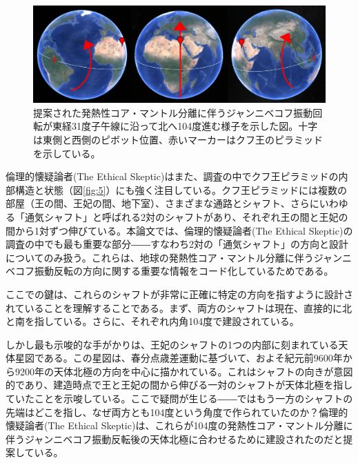 \documentclass[10pt,twocolumn,letterpaper]{article}
\begin{document}
\begin{figure}[t]
\begin{center}
\includegraphics[width=1\textwidth]{drawing.jpg}
\end{center}
   \caption{提案された発熱性コア・マントル分離に伴うジャンニベコフ振動回転が東経31度子午線に沿って北へ104度進む様子を示した図。十字は東側と西側のピボット位置、赤いマーカーはクフ王のピラミッドを示している。}
\label{fig:6}
\end{figure}

倫理的懐疑論者(The Ethical Skeptic)はまた、調査の中でクフ王ピラミッドの内部構造と状態（図\ref{fig:5}）にも強く注目している\cite{28}。クフ王ピラミッドには複数の部屋（王の間、王妃の間、地下室）、さまざまな通路とシャフト、さらにいわゆる「通気シャフト」と呼ばれる2対のシャフトがあり、それぞれ王の間と王妃の間から1対ずつ伸びている\cite{29,30}。本論文では、倫理的懐疑論者(The Ethical Skeptic)の調査の中でも最も重要な部分――すなわち2対の「通気シャフト」の方向と設計についてのみ扱う。これらは、地球の発熱性コア・マントル分離に伴うジャンニベコフ振動反転の方向に関する重要な情報をコード化しているためである。


ここでの鍵は、これらのシャフトが非常に正確に特定の方向を指すように設計されていることを理解することである。まず、両方のシャフトは現在、直接的に北と南を指している。さらに、それぞれ内角104度で建設されている。

しかし最も示唆的な手がかりは、王妃のシャフトの1つの内部に刻まれている天体星図である。この星図は、春分点歳差運動に基づいて、およそ紀元前9600年から9200年の天体北極の方向を中心に描かれている\cite{28}。これはシャフトの向きが意図的であり、建造時点で王と王妃の間から伸びる一対のシャフトが天体北極を指していたことを示唆している。ここで疑問が生じる――ではもう一方のシャフトの先端はどこを指し、なぜ両方とも104度という角度で作られていたのか？倫理的懐疑論者(The Ethical Skeptic)は、これらが104度の発熱性コア・マントル分離に伴うジャンニベコフ振動反転後の天体北極に合わせるために建設されたのだと提案している。
\end{document}
